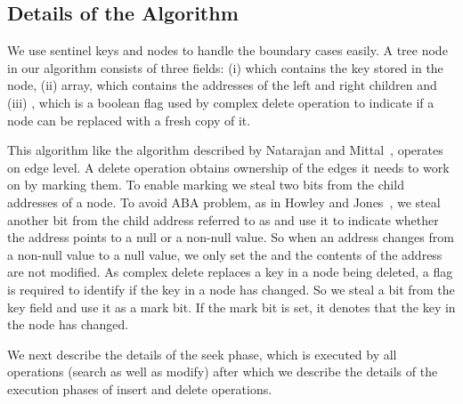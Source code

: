 

\subsection{Details of the Algorithm}
We use sentinel keys and nodes to handle the boundary cases easily. A tree node in our algorithm consists of three fields: (i) \markAndKey which contains the key stored in the node, (ii) \child array, which contains the addresses of the left and right children and (iii) \readyToReplace, which is a boolean flag used by complex delete operation to indicate if a node can be replaced with a fresh copy of it. \par
This algorithm like the algorithm described by Natarajan and Mittal~\cite{Natarajan:2014:PPOPP}, operates on edge level. A delete operation obtains ownership of the edges it needs to work on by marking them. To enable marking we steal two bits from the child addresses of a node. To avoid ABA problem, as in Howley and Jones~\cite{HowJon:2012:SPAA}, we steal another bit from the child address referred to as \nullFlag and use it to indicate whether the address points to a null or a non-null value. So when an address changes from a non-null value to a null value, we only set the \nullFlag and the contents of the address are not modified. As complex delete replaces a key in a node being deleted, a flag is required to identify if the key in a node has changed. So we steal a bit from the key field and use it as a mark bit. If the mark bit is set, it denotes that the key in the node has changed.

We next describe the details of the seek phase, which is executed by all operations (search as well as modify) after which we describe the details of the execution phases of insert and delete operations.


